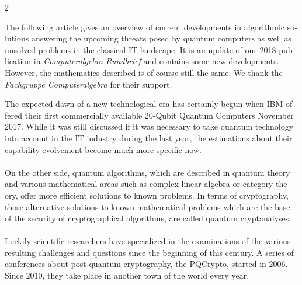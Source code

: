 \documentclass[a4paper,11pt]{article}
\begin{document}
\begin{otherlanguage}{english}

\vspace{3mm}
\begin{multicols}{2}
\noindent


\noindent
The following article gives an overview of current developments in algorithmic solutions answering the upcoming threats posed by quantum computers as well as unsolved problems in the classical IT landscape. It is an update of our 2018 publication in \emph{Computeralgebra-Rundbrief} \cite{CAR} and contains some new developments. However, the mathematics described is of course still the same. We thank the \emph{Fachgruppe Computeralgebra} for their support.

The expected dawn of a new technological era has certainly begun when IBM offered their first commercially available 20-Qubit Quantum Computers November 2017. While it was still discussed if it was necessary to take quantum technology into account in the IT industry during the last year, the estimations about their capability evolvement become much more specific now.\\ \\ 
On the other side, quantum algorithms, which are described in quantum theory and various mathematical areas such as complex linear algebra or category theory, offer more efficient solutions to known problems. In terms of cryptography, those alternative solutions to known mathematical problems which are the base of the security of cryptographical algorithms, are called quantum cryptanalyses. \\ \\
Luckily scientific researchers have specialized in the examinations of the various resulting challenges and questions since the beginning of this century. A series of conferences about post-quantum cryptography, the PQCrypto, started in 2006. Since 2010, they take place in another town of the world every year. 


\end{multicols}
\end{otherlanguage}
\end{document}
